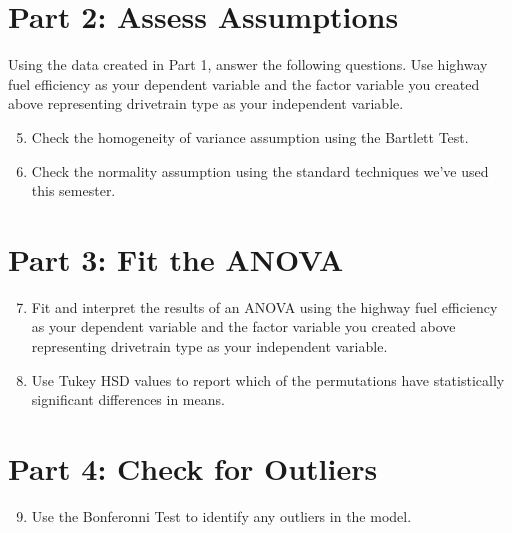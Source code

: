 \documentclass{tufte-handout}
\begin{document}
\vspace{3mm}
\section{Part 2: Assess Assumptions}
Using the data created in Part 1, answer the following questions. Use highway fuel efficiency as your dependent variable and the factor variable you created above representing drivetrain type as your independent variable.
\begin{enumerate}
\setcounter{enumi}{4}
\item Check the homogeneity of variance assumption using the Bartlett Test.
\item Check the normality assumption using the standard techniques we've used this semester.
\end{enumerate}

\vspace{3mm}
\section{Part 3: Fit the ANOVA} 
\begin{enumerate}
\setcounter{enumi}{6}
\item Fit and interpret the results of an ANOVA using the highway fuel efficiency as your dependent variable and the factor variable you created above representing drivetrain type as your independent variable.
\item Use Tukey HSD values to report which of the permutations have statistically significant differences in means. 
\end{enumerate}

\vspace{3mm}
\section{Part 4: Check for Outliers}
\begin{enumerate}
\setcounter{enumi}{8}
\item Use the Bonferonni Test to identify any outliers in the model.
\end{enumerate}

\end{document}
